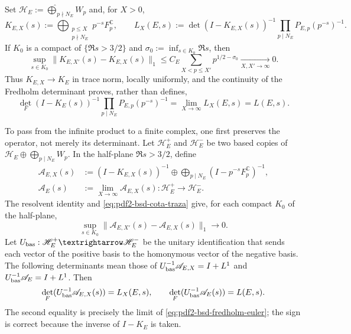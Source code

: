 Set $\mathscr H_E:=\widehat\bigoplus_{p\nmid N_E}W_p$ and, for $X>0$,
\begin{equation}\label{eq:pdf2-bsd-truncados-fredholm}
 K_{E,X}(s):=\bigoplus_{\substack{p\leq X\\p\nmid N_E}}
          p^{-s}F_p^{\mathbb C},
 \qquad
 L_X(E,s):=\det(I-K_{E,X}(s))^{-1}
       \prod_{p\mid N_E}P_{E,p}(p^{-s})^{-1}.
\end{equation}
If $K_0$ is a compact of $\{\Re s>3/2\}$ and
$\sigma_0:=\inf_{s\in K_0}\Re s$, then
\begin{equation}\label{eq:pdf2-bsd-cota-traza}
 \sup_{s\in K_0}\|K_{E,X'}(s)-K_{E,X}(s)\|_1
 \leq C_E\sum_{X<p\leq X'}p^{1/2-\sigma_0}
 \xrightarrow[X,X'\to\infty]{}0.
\end{equation}
Thus $K_{E,X}\to K_E$ in trace norm, locally uniformly, and the
continuity of the Fredholm determinant proves, rather than defines,
\begin{equation}\label{eq:pdf2-bsd-fredholm-euler}
 \det_F(I-K_E(s))^{-1}
 \prod_{p\mid N_E}P_{E,p}(p^{-s})^{-1}
 =\lim_{X\to\infty}L_X(E,s)=L(E,s).
\end{equation}

To pass from the infinite product to a finite complex, one first preserves the
operator, not merely its determinant. Let $\mathscr H_E^+$ and
$\mathscr H_E^-$ be two based copies of
$\mathscr H_E\oplus\bigoplus_{p\mid N_E}W_p$. In the half-plane
$\Re s>3/2$, define
\begin{equation}\label{eq:pdf2-bsd-operadores-euler-inversos}
 \begin{aligned}
  \mathscr A_{E,X}(s)&:=
   (I-K_{E,X}(s))^{-1}\oplus
   \bigoplus_{p\mid N_E}(I-p^{-s}F_p^{\mathbb C})^{-1},\\
  \mathscr A_E(s)&:=\lim_{X\to\infty}\mathscr A_{E,X}(s):
       \mathscr H_E^+\longrightarrow\mathscr H_E^-.
 \end{aligned}
\end{equation}
The resolvent identity and \eqref{eq:pdf2-bsd-cota-traza} give, for each
compact $K_0$ of the half-plane,
\begin{equation}\label{eq:pdf2-bsd-resolvente-convergencia-traza}
 \sup_{s\in K_0}
 \|\mathscr A_{E,X'}(s)-\mathscr A_{E,X}(s)\|_1\longrightarrow0.
\end{equation}
Let $\mathcal U_{\rm bas}:\mathscr H_E^+\to\mathscr H_E^-$ be the unitary identification that
sends each vector of the positive basis to the homonymous vector of the
negative basis. The following determinants mean those of
$\mathcal U_{\rm bas}^{-1}\mathscr A_{E,X}=I+\mathcal L^1$ and
$\mathcal U_{\rm bas}^{-1}\mathscr A_E=I+\mathcal L^1$. Then
\begin{equation}\label{eq:pdf2-bsd-det-a-x-l-x}
 \det_F(\mathcal U_{\rm bas}^{-1}\mathscr A_{E,X}(s))=L_X(E,s),
 \qquad
 \det_F(\mathcal U_{\rm bas}^{-1}\mathscr A_E(s))=L(E,s).
\end{equation}
The second equality is precisely the limit of
\eqref{eq:pdf2-bsd-fredholm-euler}; the sign is correct because the
inverse of $I-K_E$ is taken.

